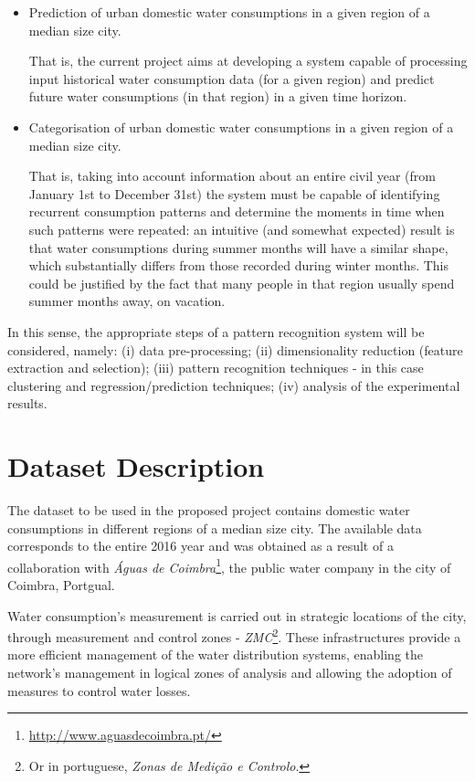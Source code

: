 \documentclass[11pt]{article}
\begin{document}
\begin{itemize}
	\item Prediction of urban domestic water consumptions in a given region of a median size city.
	
		  That is, the current project aims at developing a system capable of processing input historical water consumption data (for a given region) and predict future water consumptions (in that region) in a given time horizon.
		  
	\item Categorisation of urban domestic water consumptions in a given region of a median size city.
	
	      That is, taking into account information about an entire civil year (from January 1st to December 31st) the system must be capable of identifying recurrent consumption patterns and determine the moments in time when such patterns were repeated: an intuitive (and somewhat expected) result is that water consumptions during summer months will have a similar shape, which substantially differs from those recorded during winter months. This could be justified by the fact that many people in that region usually spend summer months away, on vacation.
\end{itemize}

In this sense, the appropriate steps of a pattern recognition system will be considered, namely: (i) data pre-processing; (ii) dimensionality reduction (feature extraction and selection); (iii) pattern recognition techniques - in this case clustering and regression/prediction techniques; (iv) analysis of the experimental results.

\section{Dataset Description}

The dataset to be used in the proposed project contains domestic water consumptions in different regions of a median size city. The available data corresponds to the entire 2016 year and was obtained as a result of a collaboration with \emph{Águas de Coimbra}\footnote{\url{http://www.aguasdecoimbra.pt/}}, the public water company in the city of Coimbra, Portgual.

Water consumption's measurement is carried out in strategic locations of the city, through measurement and control zones - \emph{ZMC}\footnote{Or in portuguese, \emph{Zonas de Medição e Controlo}.}. These infrastructures provide a more efficient management of the water distribution systems, enabling the network's management in logical zones of analysis and allowing the adoption of measures to control water losses.
\end{document}
